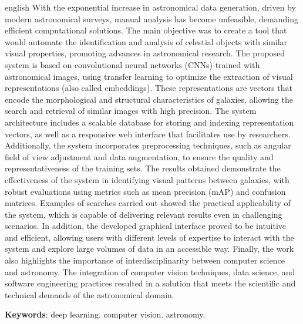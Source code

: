 \documentclass[
	12pt,				%
	openright,			%
	twoside,			%
	a4paper,			%
  sumario=tradicional,
	english,			%
	french,				%
	spanish,			%
	brazil				%
	]{abntex2}
\begin{document}
\begin{resumo}[Abstract]
  \begin{otherlanguage*}{english}
    With the exponential increase in astronomical data generation, driven by modern astronomical surveys, manual analysis has become unfeasible, demanding efficient computational solutions. The main objective was to create a tool that would automate the identification and analysis of celestial objects with similar visual properties, promoting advances in astronomical research. The proposed system is based on convolutional neural networks (CNNs) trained with astronomical images, using transfer learning to optimize the extraction of visual representations (also called embeddings). These representations are vectors that encode the morphological and structural characteristics of galaxies, allowing the search and retrieval of similar images with high precision. The system architecture includes a scalable database for storing and indexing representation vectors, as well as a responsive web interface that facilitates use by researchers. Additionally, the system incorporates preprocessing techniques, such as angular field of view adjustment and data augmentation, to ensure the quality and representativeness of the training sets. The results obtained demonstrate the effectiveness of the system in identifying visual patterns between galaxies, with robust evaluations using metrics such as mean precision (mAP) and confusion matrices. Examples of searches carried out showed the practical applicability of the system, which is capable of delivering relevant results even in challenging scenarios. In addition, the developed graphical interface proved to be intuitive and efficient, allowing users with different levels of expertise to interact with the system and explore large volumes of data in an accessible way. Finally, the work also highlights the importance of interdisciplinarity between computer science and astronomy. The integration of computer vision techniques, data science, and software engineering practices resulted in a solution that meets the scientific and technical demands of the astronomical domain.

    \vspace{\onelineskip}

    \noindent
    \textbf{Keywords}: deep learning. computer vision. astronomy.
  \end{otherlanguage*}
\end{resumo}

\end{document}
